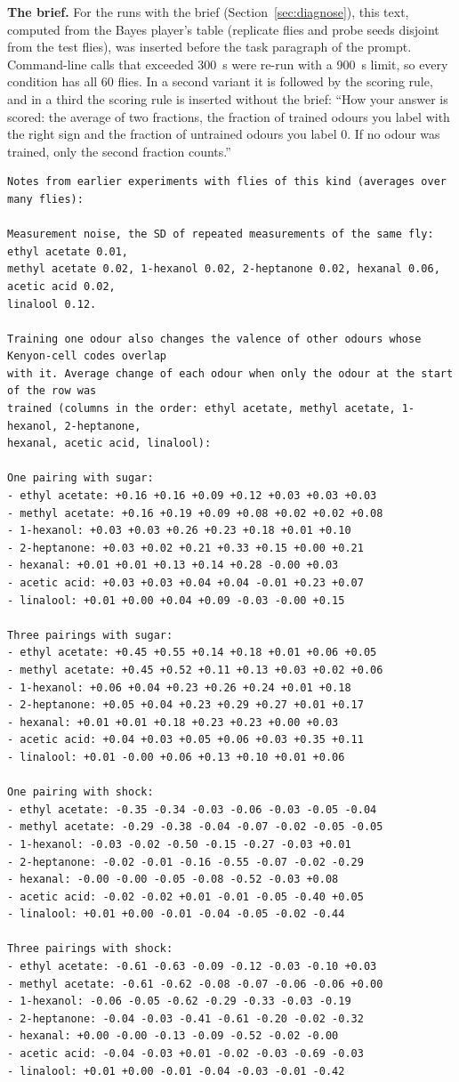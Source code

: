 \textbf{The brief.} For the runs with the brief (Section~\ref{sec:diagnose}), this text, computed from the Bayes player's table (replicate flies and probe seeds disjoint from the test flies), was inserted before the task paragraph of the prompt. Command-line calls that exceeded 300~s were re-run with a 900~s limit, so every condition has all 60 flies. In a second variant it is followed by the scoring rule, and in a third the scoring rule is inserted without the brief: ``How your answer is scored: the average of two fractions, the fraction of trained odours you label with the right sign and the fraction of untrained odours you label 0. If no odour was trained, only the second fraction counts.''
{\scriptsize
\begin{verbatim}
Notes from earlier experiments with flies of this kind (averages over many flies):

Measurement noise, the SD of repeated measurements of the same fly: ethyl acetate 0.01,
methyl acetate 0.02, 1-hexanol 0.02, 2-heptanone 0.02, hexanal 0.06, acetic acid 0.02,
linalool 0.12.

Training one odour also changes the valence of other odours whose Kenyon-cell codes overlap
with it. Average change of each odour when only the odour at the start of the row was
trained (columns in the order: ethyl acetate, methyl acetate, 1-hexanol, 2-heptanone,
hexanal, acetic acid, linalool):

One pairing with sugar:
- ethyl acetate: +0.16 +0.16 +0.09 +0.12 +0.03 +0.03 +0.03
- methyl acetate: +0.16 +0.19 +0.09 +0.08 +0.02 +0.02 +0.08
- 1-hexanol: +0.03 +0.03 +0.26 +0.23 +0.18 +0.01 +0.10
- 2-heptanone: +0.03 +0.02 +0.21 +0.33 +0.15 +0.00 +0.21
- hexanal: +0.01 +0.01 +0.13 +0.14 +0.28 -0.00 +0.03
- acetic acid: +0.03 +0.03 +0.04 +0.04 -0.01 +0.23 +0.07
- linalool: +0.01 +0.00 +0.04 +0.09 -0.03 -0.00 +0.15

Three pairings with sugar:
- ethyl acetate: +0.45 +0.55 +0.14 +0.18 +0.01 +0.06 +0.05
- methyl acetate: +0.45 +0.52 +0.11 +0.13 +0.03 +0.02 +0.06
- 1-hexanol: +0.06 +0.04 +0.23 +0.26 +0.24 +0.01 +0.18
- 2-heptanone: +0.05 +0.04 +0.23 +0.29 +0.27 +0.01 +0.17
- hexanal: +0.01 +0.01 +0.18 +0.23 +0.23 +0.00 +0.03
- acetic acid: +0.04 +0.03 +0.05 +0.06 +0.03 +0.35 +0.11
- linalool: +0.01 -0.00 +0.06 +0.13 +0.10 +0.01 +0.06

One pairing with shock:
- ethyl acetate: -0.35 -0.34 -0.03 -0.06 -0.03 -0.05 -0.04
- methyl acetate: -0.29 -0.38 -0.04 -0.07 -0.02 -0.05 -0.05
- 1-hexanol: -0.03 -0.02 -0.50 -0.15 -0.27 -0.03 +0.01
- 2-heptanone: -0.02 -0.01 -0.16 -0.55 -0.07 -0.02 -0.29
- hexanal: -0.00 -0.00 -0.05 -0.08 -0.52 -0.03 +0.08
- acetic acid: -0.02 -0.02 +0.01 -0.01 -0.05 -0.40 +0.05
- linalool: +0.01 +0.00 -0.01 -0.04 -0.05 -0.02 -0.44

Three pairings with shock:
- ethyl acetate: -0.61 -0.63 -0.09 -0.12 -0.03 -0.10 +0.03
- methyl acetate: -0.61 -0.62 -0.08 -0.07 -0.06 -0.06 +0.00
- 1-hexanol: -0.06 -0.05 -0.62 -0.29 -0.33 -0.03 -0.19
- 2-heptanone: -0.04 -0.03 -0.41 -0.61 -0.20 -0.02 -0.32
- hexanal: +0.00 -0.00 -0.13 -0.09 -0.52 -0.02 -0.00
- acetic acid: -0.04 -0.03 +0.01 -0.02 -0.03 -0.69 -0.03
- linalool: +0.01 +0.00 -0.01 -0.04 -0.03 -0.01 -0.42
\end{verbatim}}

